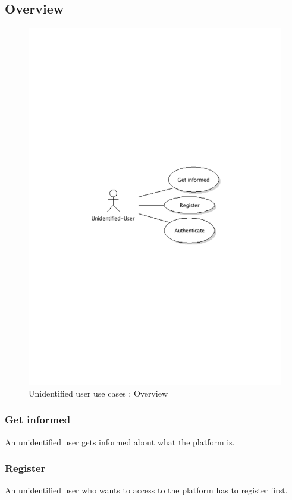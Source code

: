 	\subsection{Overview}
		\begin{figure}[ht]
			\begin{center}
				\includegraphics[width=\textwidth,  trim=2cm 12cm 2cm 11cm]{UML_figure/use_cases/uni_user/UC_UniUser_General.pdf}
				\caption{Unidentified user use cases : Overview}
			\end{center}
		\end{figure}
		\subsubsection{Get informed}An unidentified user gets informed about what the platform is.
		\subsubsection{Register}An unidentified user who wants to access to the platform has to register first.
